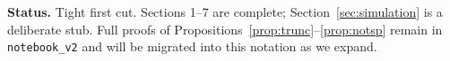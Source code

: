 \documentclass[11pt,letterpaper]{article}
\theoremstyle{definition}
\theoremstyle{plain}
\theoremstyle{remark}
\begin{document}
\nocite{stolicki2020,munagala2022,thiele1895,azizlee2020,lackner2022,sanchez2017}
\renewcommand{\bibsection}{\subsection*{References}}



\begin{aside}\small
\textbf{Status.} Tight first cut. Sections 1--7 are complete; Section~\ref{sec:simulation} is a
deliberate stub. Full proofs of Propositions~\ref{prop:trunc}--\ref{prop:notsp} remain in
\texttt{notebook\_v2} and will be migrated into this notation as we expand.
\end{aside}
\end{document}
